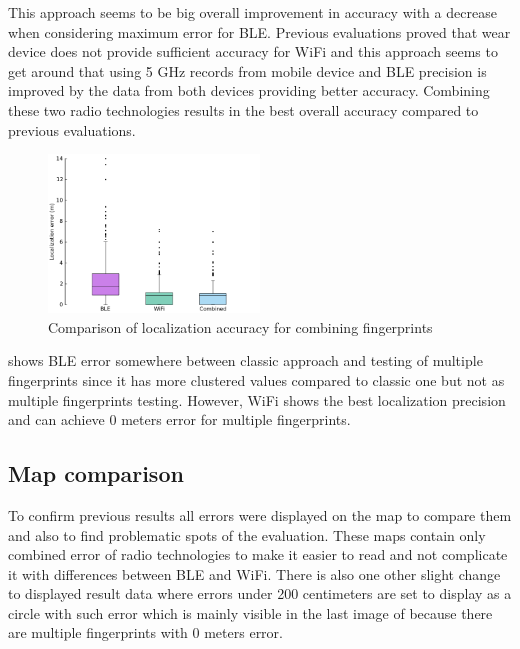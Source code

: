 This approach seems to be big overall improvement in accuracy with a decrease when considering maximum error for BLE. Previous evaluations proved that wear device does not provide sufficient accuracy for WiFi and this approach seems to get around that using 5 GHz records from mobile device and BLE precision is improved by the data from both devices providing better accuracy. Combining these two radio technologies results in the best overall accuracy compared to previous evaluations.

\begin{figure}[h!]
	\begin{centering}
		\includegraphics[width=0.5\textwidth]{img/wknn_errors_combined}
		\par\end{centering}
	\caption{Comparison of localization accuracy for combining fingerprints}
	\label{fig08c06}
\end{figure}

 shows BLE error somewhere between classic approach and testing of multiple fingerprints since it has more clustered values compared to classic one but not as multiple fingerprints testing. However, WiFi shows the best localization precision and can achieve 0 meters error for multiple fingerprints. 

\subsection{Map comparison}\label{sec:MapComparison}
To confirm previous results all errors were displayed on the map to compare them and also to find problematic spots of the evaluation. These maps contain only combined error of radio technologies to make it easier to read and not complicate it with differences between BLE and WiFi. There is also one other slight change to displayed result data where errors under 200 centimeters are set to display as a circle with such error which is mainly visible in the last image of  because there are multiple fingerprints with 0 meters error.

